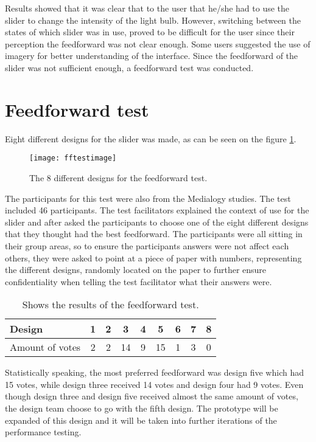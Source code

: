 Results showed that it was clear that to the user that he/she had to use the slider to change the intensity of the light bulb. However, switching between the states of which slider was in use, proved to be difficult for the user since their perception the feedforward was not clear enough. Some users suggested the use of imagery for better understanding of the interface. Since the feedforward of the slider was not sufficient enough, a feedforward test was conducted.

\section{Feedforward test}\label{sec:fftest}
Eight different designs for the slider was made, as can be seen on the figure \ref{fig:fftestimage}.

\begin{figure}[!h] 
\centering
\texttt{[image: fftestimage]}
\caption{\label{fig:fftestimage} The 8 different designs for the feedforward test.}
\end{figure}

The participants for this test were also from the Medialogy studies. The test included 46 participants. The test facilitators explained the context of use for the slider and after asked the participants to choose one of the eight different designs that they thought had the best feedforward. The participants were all sitting in their group areas, so to ensure the participants answers were not affect each others, they were asked to point at a piece of paper with numbers, representing the different designs, randomly located on the paper to further ensure confidentiality when telling the test facilitator what their answers were. 

\begin{table}[!h]
\centering
\caption{Shows the results of the feedforward test.\label{tab:sliderresults}}
\begin{tabular}{|l|c|c|c|c|c|c|c|c|}
\hline
Design & 1 & 2 & 3 & 4 & 5 & 6 & 7 & 8 \\ \hline
Amount of votes & 2 & 2 & 14 & 9 & 15 & 1 & 3 & 0 \\ \hline
\end{tabular}
\end{table}

Statistically speaking, the most preferred feedforward was design five which had 15 votes, while design three received 14 votes and design four had 9 votes.
Even though design three and design five received almost the same amount of votes, the design team choose to go with the fifth design. The prototype will be expanded of this design and it will be taken into further iterations of the performance testing. 



